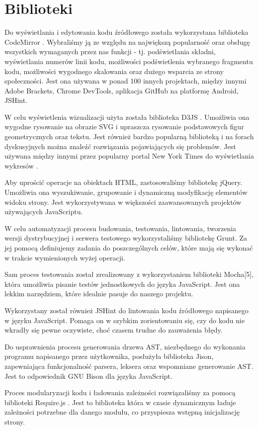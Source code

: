 \documentclass[a4paper,twoside,openright,11pt]{report}
\begin{document}
  \section{Biblioteki}
\par Do wyświetlania i edytowania kodu źródłowego została wykorzystana biblioteka CodeMirror \cite{cm}. Wybraliśmy ją ze względu na największą popularność oraz obsługę wszystkich wymaganych przez nas funkcji - tj. podświetlania składni, wyświetlania numerów linii kodu, możliwości podświetlenia wybranego fragmentu kodu, możliwości wygodnego skalowania oraz dużego wsparcia ze strony społeczności. Jest ona używana w ponad 100 innych projektach, między innymi Adobe Brackets, Chrome DevTools, aplikacja GitHub na platformę Android, JSHint. \cite{jshint}
\par W celu wyświetlenia wizualizacji użyta została biblioteka D3JS \cite{d3js}. Umożliwia ona wygodne rysowanie na obrazie SVG i upraszcza rysowanie podstawowych figur geometrycznych oraz tekstu. Jest również bardzo popularną biblioteką i na forach dyskusyjnych można znaleźć rozwiązania pojawiających się problemów. Jest używana między innymi przez popularny portal New York Times do wyświetlania wykresów \cite{ny}.
\par Aby uprościć operacje na obiektach HTML, zastosowaliśmy bibliotekę jQuery. \cite{jquery} Umożliwia ona wyszukiwanie, grupowanie i dynamiczną modyfikację elementów widoku strony. Jest wykorzystywana w większości zaawansowanych projektów używających JavaScriptu.
\par W celu automatyzacji procesu budowania, testowania, lintowania, tworzenia wersji dystrybucyjnej i serwera testowego wykorzystaliśmy bibliotekę Grunt.\cite{gruntjs} Za jej pomocą definiujemy zadania do poszczególnych celów, które mają się wykonać w trakcie wymienionych wyżej operacji. 
\par Sam proces testowania został zrealizowany z wykorzystaniem biblioteki Mocha[5], która umożliwia pisanie testów jednostkowych do języka JavaScript. Jest ona lekkim narzędziem, które idealnie pasuje do naszego projektu.
\par Wykorzystany został również JSHint\cite{jshint} do lintowania kodu źródłowego napisanego w języku JavaScript. Pomaga on w szybkim zorientowaniu się, czy do kodu nie wkradły się pewne oczywiste, choć czasem trudne do zauważenia błędy.
\par Do usprawnienia procesu generowania drzewa AST, niezbędnego do wykonania programu napisanego przez użytkownika, posłużyła biblioteka Jison\cite{jison}, zapewniająca funkcjonalność parsera, leksera oraz wspomniane generowanie AST. Jest to odpowiednik GNU Bison dla języka JavaScript.
\par Proces modularyzacji kodu i ładowania zależności rozwiązaliśmy za pomocą biblioteki Require.js \cite{requirejs}. Jest to biblioteka która w czasie dynamicznym ładuje zależności potrzebne dla danego modułu, co przyspiesza wstępną inicjalizację strony. 
\end{document}
